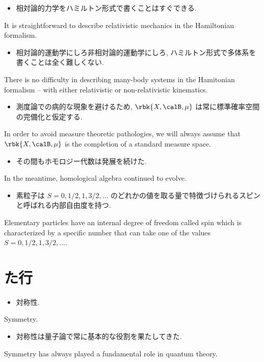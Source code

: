\documentclass[openany, a4paper, oneside]{jsbook}
\begin{document}
\begin{itemize}
\item 相対論的力学をハミルトン形式で書くことはすぐできる. \cite{LiebSeiringer1}
\end{itemize}
It is straightforward to describe relativistic mechanics in the Hamiltonian formalism.

\begin{itemize}
\item 相対論的運動学にしろ非相対論的運動学にしろ, ハミルトン形式で多体系を書くことは全く難しくない. \cite{LiebSeiringer1}
\end{itemize}
There is no difficulty in describing many-body systems in the Hamitonian formalism
-- with either relativistic or non-relativistic kinematics.

\begin{itemize}
\item 測度論での病的な現象を避けるため, $\rbk{X, \calB, \mu}$ は常に標準確率空間の完備化と仮定する.
\end{itemize}
In order to avoid measure theoretic pathologies, we will always assume that
$\rbk{X, \calB, \mu}$ is the completion of a standard measure space.

\begin{itemize}
\item その間もホモロジー代数は発展を続けた. \cite{CharlesWeibel1}
\end{itemize}
In the meantime, homological algebra continued to evolve.

\begin{itemize}
\item 素粒子は $S = 0, 1/2, 1, 3/2, \dots$ のどれかの値を取る量で特徴づけられるスピンと呼ばれる内部自由度を持つ. \cite{LiebSeiringer1}
\end{itemize}
Elementary particles have an internal degree of freedom called spin which is characterized
by a specific number that can take one of the values $S = 0, 1/2, 1, 3/2, \dots$.
\section{た行}

\begin{itemize}
\item 対称性.
\end{itemize}
Symmetry.

\begin{itemize}
\item 対称性は量子論で常に基本的な役割を果たしてきた. \cite{VSVaradarajan1}
\end{itemize}
Symmetry has always played a fundamental role in quantum theory.
\end{document}

